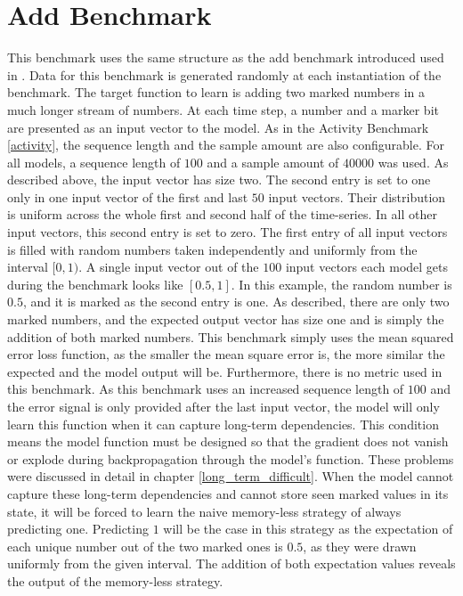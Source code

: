 \documentclass[draft,final]{vutinfth} %
\begin{document}
\section{Add Benchmark} \label{add}
This benchmark uses the same structure as the add benchmark introduced used in \cite{UnitaryRNNs}.
Data for this benchmark is generated randomly at each instantiation of the benchmark.
The target function to learn is adding two marked numbers in a much longer stream of numbers.
At each time step, a number and a marker bit are presented as an input vector to the model.
As in the Activity Benchmark \ref{activity}, the sequence length and the sample amount are also configurable.
For all models, a sequence length of $100$ and a sample amount of $40000$ was used.
As described above, the input vector has size two.
The second entry is set to one only in one input vector of the first and last $50$ input vectors.
Their distribution is uniform across the whole first and second half of the time-series.
In all other input vectors, this second entry is set to zero.
The first entry of all input vectors is filled with random numbers taken independently and uniformly from the interval $[0,1)$.
A single input vector out of the $100$ input vectors each model gets during the benchmark looks like $[0.5,1]$.
In this example, the random number is $0.5$, and it is marked as the second entry is one.
As described, there are only two marked numbers, and the expected output vector has size one and is simply the addition of both marked numbers.
This benchmark simply uses the mean squared error loss function, as the smaller the mean square error is, the more similar the expected and the model output will be.
Furthermore, there is no metric used in this benchmark.
As this benchmark uses an increased sequence length of $100$ and the error signal is only provided after the last input vector, the model will only learn this function when it can capture long-term dependencies.
This condition means the model function must be designed so that the gradient does not vanish or explode during backpropagation through the model's function.
These problems were discussed in detail in chapter \ref{long_term_difficult}.
When the model cannot capture these long-term dependencies and cannot store seen marked values in its state, it will be forced to learn the naive memory-less strategy of always predicting one.
Predicting $1$ will be the case in this strategy as the expectation of each unique number out of the two marked ones is $0.5$, as they were drawn uniformly from the given interval.
The addition of both expectation values reveals the output of the memory-less strategy.
\end{document}
